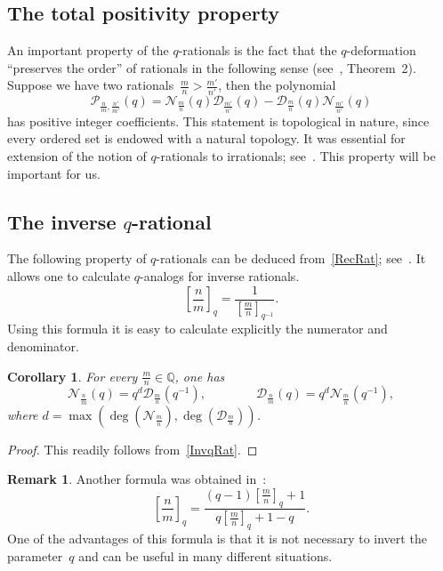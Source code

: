 \documentclass{article}[12pt]
\theoremstyle{plain}
\newtheorem{cor}[lem]{Corollary}
\theoremstyle{definition}
\newtheorem*{rem}{Remark}
\newcommand{\Q}{\mathbb{Q}}
\newcommand{\cD}{\mathcal{D}}
\newcommand{\cN}{\mathcal{N}}
\begin{document}
\subsection{The total positivity property}\label{TPSec}

An important property of the $q$-rationals is the fact that the $q$-deformation
``preserves the order'' of rationals 
in the following sense (see~\cite{MGOfmsigma}, Theorem~2).
Suppose we have two rationals~$\frac{m}{n}>\frac{m'}{n'}$, 
then the polynomial 
$$
\mathcal{P}_{\frac{n}{m},\frac{n'}{m'}}(q)=
\cN_{\frac{m}{n}}(q)\cD_{\frac{m'}{n'}}(q)-\cD_{\frac{m}{n}}(q)\cN_{\frac{m'}{n'}}(q)
$$
has positive integer coefficients.
This statement is topological in nature,
since every ordered set is endowed with a natural topology.
It was essential for extension of the notion of $q$-rationals to irrationals; 
see~\cite{MGOexp}.
This property will be important for us.

\subsection{The inverse $q$-rational}

The following property of $q$-rationals 
can be deduced from~\eqref{RecRat}; see~\cite{LMGadv}.
It allows one to calculate 
$q$-analogs for inverse rationals.
\begin{equation}
\label{InvqRat}
\left[\frac{n}{m}\right]_q=
\frac{1}{\left[\frac{m}{n}\right]_{q^{-1}}}.
\end{equation}
Using this formula it is easy to calculate explicitly the numerator and denominator.

\begin{cor}
\label{NDProp}
For every $\frac{m}{n}\in\Q$, one has
\begin{equation}
\label{NumDenExp}
\cN_{\frac{n}{m}}(q)=q^d\cD_{\frac{m}{n}}(q^{-1}),
\qquad\qquad
\cD_{\frac{n}{m}}(q)=q^d\cN_{\frac{m}{n}}(q^{-1}),
\end{equation}
where $d=\max(\deg(\cN_{\frac{m}{n}}),\deg(\cD_{\frac{m}{n}}))$.
\end{cor}

\begin{proof}
This readily follows from~\eqref{InvqRat}.
\end{proof}


\begin{rem}
Another formula was obtained in~\cite{Per2}:
$$
\left[\frac{n}{m}\right]_q=
\frac{\left(q-1\right)\left[\frac{m}{n}\right]_q+1}{q\left[\frac{m}{n}\right]_q+1-q}.
$$
One of the advantages of this formula is that it is not necessary to invert the parameter~$q$
and can be useful in many different situations.
\end{rem}
\end{document}
